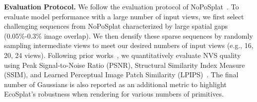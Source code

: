 
\noindent \textbf{Evaluation Protocol.}  
We follow the evaluation protocol of NoPoSplat~\cite{ye2024no}. To evaluate model performance with a large number of input views, we first select challenging sequences from {NoPoSplat} characterized by large spatial gaps (0.05\%-0.3\% image overlap). We then densify these sparse sequences by randomly sampling intermediate views to meet our desired numbers of input views (e.g., 16, 20, 24 views). Following prior works~\cite{xu2025depthsplat,jiang2025anysplat, huang2025no, zhang2024gaussian, ye2024no}, we quantitatively evaluate NVS quality using Peak Signal-to-Noise Ratio (PSNR), Structural Similarity Index Measure (SSIM), and Learned Perceptual Image Patch Similarity (LPIPS)~\cite{zhang2018perceptual}. The final number of Gaussians is also reported as an additional metric to highlight EcoSplat's robustness when rendering for various numbers of primitives.





